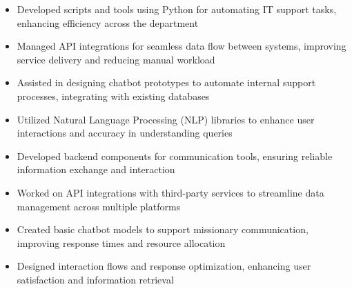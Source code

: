 \par\smallskip
\noindent
\begin{minipage}{20cm}
  \begin{minipage}{9.75cm}
    \begin{itemize}
      \item Developed scripts and tools using Python for automating IT support tasks, enhancing efficiency across the department
      \item Managed API integrations for seamless data flow between systems, improving service delivery and reducing manual workload
    \end{itemize}
  \end{minipage}
  \hfill
  \begin{minipage}{9.75cm}
    \begin{itemize}
      \item Assisted in designing chatbot prototypes to automate internal support processes, integrating with existing databases
      \item Utilized Natural Language Processing (NLP) libraries to enhance user interactions and accuracy in understanding queries
    \end{itemize}
  \end{minipage}
\end{minipage}
\par\smallskip
\divider

\par\smallskip
\noindent
\begin{minipage}{20cm}
  \begin{minipage}{9.75cm}
    \begin{itemize}
      \item Developed backend components for communication tools, ensuring reliable information exchange and interaction
      \item Worked on API integrations with third-party services to streamline data management across multiple platforms
    \end{itemize}
  \end{minipage}
  \hfill
  \begin{minipage}{9.75cm}
    \begin{itemize}
      \item Created basic chatbot models to support missionary communication, improving response times and resource allocation
      \item Designed interaction flows and response optimization, enhancing user satisfaction and information retrieval
    \end{itemize}
  \end{minipage}
\end{minipage}

